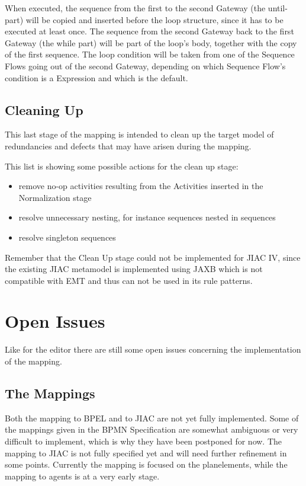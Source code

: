 When executed, the sequence from the first to the second Gateway (the until-part) will be copied and inserted before the loop structure, since it has to be executed at least once. The sequence from the second Gateway back to the first Gateway (the while part) will be part of the loop's body, together with the copy of the first sequence. The loop condition will be taken from one of the Sequence Flows going out of the second Gateway, depending on which Sequence Flow's condition is a Expression and which is the default.


\subsection{Cleaning Up}

This last stage of the mapping is intended to clean up the target model of redundancies and defects that may have arisen during the mapping.

This list is showing some possible actions for the clean up stage:
\begin{itemize}
	\item remove no-op activities resulting from the Activities inserted in the Normalization stage
	\item resolve unnecessary nesting, for instance sequences nested in sequences
	\item resolve singleton sequences
\end{itemize}

Remember that the Clean Up stage could not be implemented for JIAC IV, since the existing JIAC metamodel is implemented using JAXB which is not compatible with EMT and thus can not be used in its rule patterns.



\section{Open Issues}
\label{sec:mapping_openissues}

Like for the editor there are still some open issues concerning the implementation of the mapping.


\subsection{The Mappings}

Both the mapping to BPEL and to JIAC are not yet fully implemented.
Some of the mappings given in the BPMN Specification are somewhat ambiguous or very difficult to implement, which is why they have been postponed for now.
The mapping to JIAC is not fully specified yet and will need further refinement in some points. Currently the mapping is focused on the planelements, while the mapping to agents is at a very early stage.

